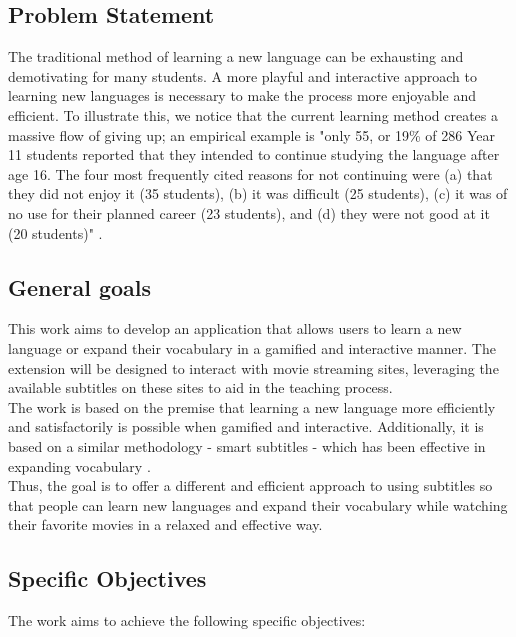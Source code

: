 \documentclass[12pt]{article}
\begin{document}
\subsection{Problem Statement}
The traditional method of learning a new language can be exhausting and demotivating for many students. A more playful and interactive approach to learning new languages is necessary to make the process more enjoyable and efficient. 
To illustrate this, we notice that the current learning method creates a massive flow of giving up; an empirical example is "only 55, or 19\% of 286 Year 11 students reported that they intended to continue studying the language after age 16. The four most frequently cited reasons for not continuing were (a) that they did not enjoy it (35 students), (b) it was difficult (25 students), (c) it was of no use for their planned career (23 students), and (d) they were not good at it (20 students)" \cite{Graham1}. 

\subsection{General goals}

This work aims to develop an application that allows users to learn a new language or expand their vocabulary in a gamified and interactive manner. The extension will be designed to interact with movie streaming sites, leveraging the available subtitles on these sites to aid in the teaching process. \\
The work is based on the premise that learning a new language more efficiently and satisfactorily is possible when gamified and interactive. Additionally, it is based on a similar methodology - smart subtitles - which has been effective in expanding vocabulary \cite{Kovacs14}. \\
Thus, the goal is to offer a different and efficient approach to using subtitles so that people can learn new languages and expand their vocabulary while watching their favorite movies in a relaxed and effective way.

\subsection{Specific Objectives}
The work aims to achieve the following specific objectives:
\end{document}
